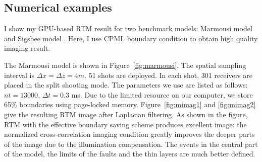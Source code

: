 % 




\subsection{Numerical examples}
I show my GPU-based RTM result for two benchmark models: Marmousi model \citep{versteeg1994marmousi} and Sigsbee model \citep{dimarco2001general}. Here, I use CPML boundary condition to obtain high quality imaging result. 

The Marmousi model is shown in Figure~\ref{fig:marmousi}. The spatial sampling interval is $\Delta x=\Delta z=4m$. 51 shots are deployed. In each shot, 301 receivers are placed in the split shooting mode. The parameters we use are listed as follows: $nt=13000$, $\Delta t=0.3$ ms. Due to the limited resource on our computer, we store 65\% boundaries using page-locked memory. Figure~\ref{fig:mimag1} and \ref{fig:mimag2} give the resulting RTM image after Laplacian filtering. As shown in the figure, RTM with the effective boundary saving scheme produces excellent image: the normalized cross-correlation imaging condition greatly improves the deeper parts of the image due to the illumination compensation. The events in the central part of the model, the limits of the faults and the thin layers are much better defined.

% 
% 
% 
% 


